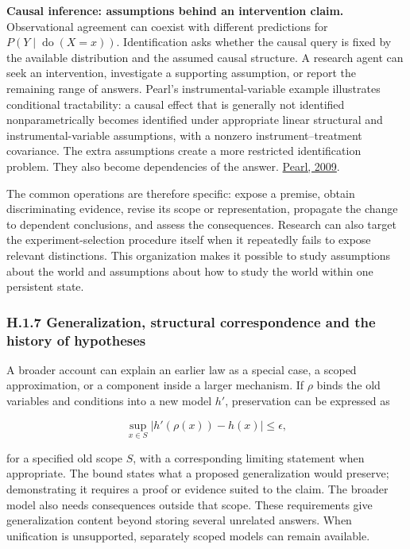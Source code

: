 \documentclass[twoside,11pt]{article}
\begin{document}
\textbf{Causal inference: assumptions behind an intervention claim.} Observational agreement can coexist with different predictions for \(P(Y\mid\operatorname{do}(X=x))\). Identification asks whether the causal query is fixed by the available distribution and the assumed causal structure. A research agent can seek an intervention, investigate a supporting assumption, or report the remaining range of answers. Pearl's instrumental-variable example illustrates conditional tractability: a causal effect that is generally not identified nonparametrically becomes identified under appropriate linear structural and instrumental-variable assumptions, with a nonzero instrument--treatment covariance. The extra assumptions create a more restricted identification problem. They also become dependencies of the answer. \href{https://escholarship.org/content/qt36w8n7pg/qt36w8n7pg.pdf}{Pearl, 2009}.


The common operations are therefore specific: expose a premise, obtain discriminating evidence, revise its scope or representation, propagate the change to dependent conclusions, and assess the consequences. Research can also target the experiment-selection procedure itself when it repeatedly fails to expose relevant distinctions. This organization makes it possible to study assumptions about the world and assumptions about how to study the world within one persistent state.


\subsubsection*{H.1.7 Generalization, structural correspondence and the history of hypotheses}

A broader account can explain an earlier law as a special case, a scoped approximation, or a component inside a larger mechanism. If \(\rho\) binds the old variables and conditions into a new model \(h'\), preservation can be expressed as


\[
\sup_{x\in S}\left|h'(\rho(x))-h(x)\right|\leq\epsilon,
\]


for a specified old scope \(S\), with a corresponding limiting statement when appropriate. The bound states what a proposed generalization would preserve; demonstrating it requires a proof or evidence suited to the claim. The broader model also needs consequences outside that scope. These requirements give generalization content beyond storing several unrelated answers. When unification is unsupported, separately scoped models can remain available.
\end{document}
